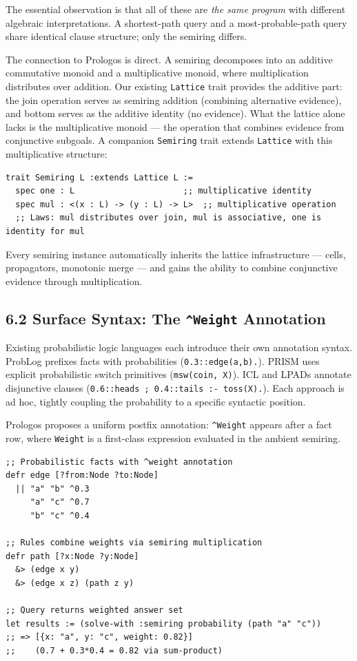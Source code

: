\documentclass[11pt]{article}
\begin{document}
The essential observation is that all of these are \emph{the same program} with different algebraic interpretations. A shortest-path query and a most-probable-path query share identical clause structure; only the semiring differs.

The connection to Prologos is direct. A semiring decomposes into an additive commutative monoid and a multiplicative monoid, where multiplication distributes over addition. Our existing \texttt{Lattice} trait provides the additive part: the join operation serves as semiring addition (combining alternative evidence), and bottom serves as the additive identity (no evidence). What the lattice alone lacks is the multiplicative monoid --- the operation that combines evidence from conjunctive subgoals. A companion \texttt{Semiring} trait extends \texttt{Lattice} with this multiplicative structure:

\begin{verbatim}
trait Semiring L :extends Lattice L :=
  spec one : L                      ;; multiplicative identity
  spec mul : <(x : L) -> (y : L) -> L>  ;; multiplicative operation
  ;; Laws: mul distributes over join, mul is associative, one is identity for mul
\end{verbatim}

Every semiring instance automatically inherits the lattice infrastructure --- cells, propagators, monotonic merge --- and gains the ability to combine conjunctive evidence through multiplication.
\subsection{6.2 Surface Syntax: The \texttt{\textasciicircum{}Weight} Annotation}
\label{sec:orgd094955}

Existing probabilistic logic languages each introduce their own annotation syntax. ProbLog prefixes facts with probabilities (\texttt{0.3::edge(a,b).}). PRISM uses explicit probabilistic switch primitives (\texttt{msw(coin, X)}). ICL and LPADs annotate disjunctive clauses (\texttt{0.6::heads ; 0.4::tails :- toss(X).}). Each approach is ad hoc, tightly coupling the probability to a specific syntactic position.

Prologos proposes a uniform postfix annotation: \texttt{\textasciicircum{}Weight} appears after a fact row, where \texttt{Weight} is a first-class expression evaluated in the ambient semiring.

\begin{verbatim}
;; Probabilistic facts with ^weight annotation
defr edge [?from:Node ?to:Node]
  || "a" "b" ^0.3
     "a" "c" ^0.7
     "b" "c" ^0.4

;; Rules combine weights via semiring multiplication
defr path [?x:Node ?y:Node]
  &> (edge x y)
  &> (edge x z) (path z y)

;; Query returns weighted answer set
let results := (solve-with :semiring probability (path "a" "c"))
;; => [{x: "a", y: "c", weight: 0.82}]
;;    (0.7 + 0.3*0.4 = 0.82 via sum-product)
\end{verbatim}
\end{document}

